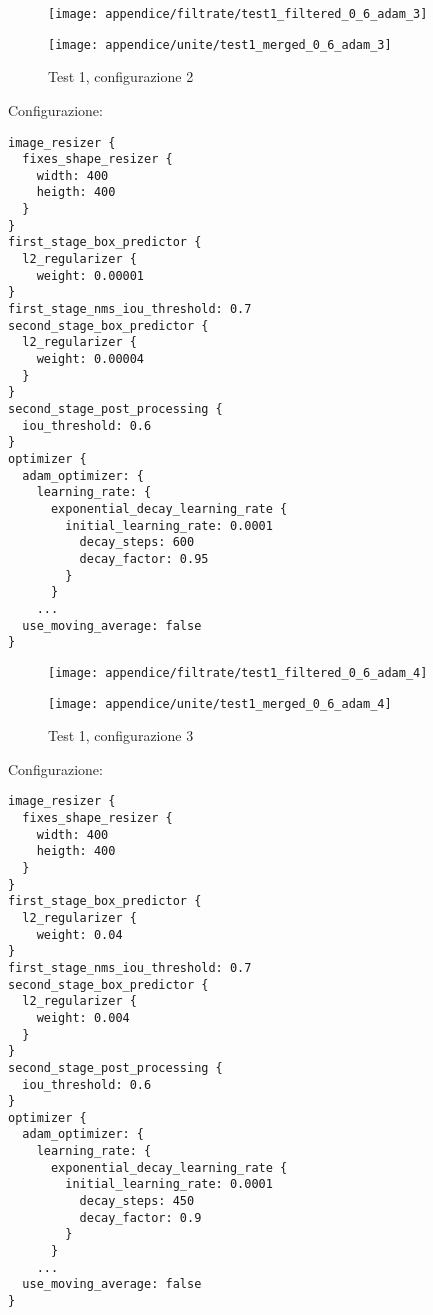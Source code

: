 \newpage
\begin{figure}[H]  
    \begin{minipage}{.5\columnwidth}  
        \centering  
        \texttt{[image: appendice/filtrate/test1\_filtered\_0\_6\_adam\_3]}  
    \end{minipage}%
    \begin{minipage}{0.5\columnwidth}  
        \centering  
        \texttt{[image: appendice/unite/test1\_merged\_0\_6\_adam\_3]}  
    \end{minipage}  
    \caption{Test 1, configurazione 2}
\end{figure}%
Configurazione:
\begin{multicols}{2}
    \begin{lstlisting}
image_resizer {
  fixes_shape_resizer {
    width: 400
    heigth: 400
  }
}
first_stage_box_predictor {
  l2_regularizer {
    weight: 0.00001
}
first_stage_nms_iou_threshold: 0.7
second_stage_box_predictor {
  l2_regularizer {
    weight: 0.00004
  }
}
second_stage_post_processing {
  iou_threshold: 0.6
}
optimizer {
  adam_optimizer: {
    learning_rate: {
      exponential_decay_learning_rate {
        initial_learning_rate: 0.0001
          decay_steps: 600
          decay_factor: 0.95
        }
      }
    ...
  use_moving_average: false
}
    \end{lstlisting}
\end{multicols}

\newpage
\begin{figure}[H]  
    \begin{minipage}{.5\columnwidth}  
        \centering  
        \texttt{[image: appendice/filtrate/test1\_filtered\_0\_6\_adam\_4]}  
    \end{minipage}%
    \begin{minipage}{0.5\columnwidth}  
        \centering  
        \texttt{[image: appendice/unite/test1\_merged\_0\_6\_adam\_4]}  
    \end{minipage}  
    \caption{Test 1, configurazione 3}
\end{figure}%
Configurazione:
\begin{multicols}{2}
    \begin{lstlisting}
image_resizer {
  fixes_shape_resizer {
    width: 400
    heigth: 400
  }
}
first_stage_box_predictor {
  l2_regularizer {
    weight: 0.04
}
first_stage_nms_iou_threshold: 0.7
second_stage_box_predictor {
  l2_regularizer {
    weight: 0.004
  }
}
second_stage_post_processing {
  iou_threshold: 0.6
}
optimizer {
  adam_optimizer: {
    learning_rate: {
      exponential_decay_learning_rate {
        initial_learning_rate: 0.0001
          decay_steps: 450
          decay_factor: 0.9
        }
      }
    ...
  use_moving_average: false
}
    \end{lstlisting}
\end{multicols}


